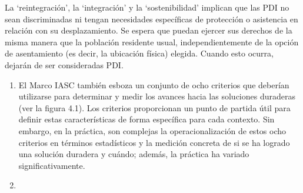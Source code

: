 \documentclass[
]{book}
\begin{document}
La `reintegración', la `integración' y la `sostenibilidad' implican que las PDI no sean discriminadas ni tengan necesidades específicas de protección o asistencia en relación con su desplazamiento. Se espera que puedan ejercer sus derechos de la misma manera que la población residente usual, independientemente de la opción de asentamiento (es decir, la ubicación física) elegida. Cuando esto ocurra, dejarán de ser consideradas PDI.

\begin{enumerate}
\def\labelenumi{\arabic{enumi}.}
\item
  El Marco IASC también esboza un conjunto de ocho criterios que deberían utilizarse para determinar y medir los avances hacia las soluciones duraderas (ver la figura 4.1). Los criterios proporcionan un punto de partida útil para definir estas características de forma específica para cada contexto. Sin embargo, en la práctica, son complejas la operacionalización de estos ocho criterios en términos estadísticos y la medición concreta de si se ha logrado una solución duradera y cuándo; además, la práctica ha variado significativamente.
\item ~
  \hypertarget{biblioteca-de-indicadores-de-soluciones-duraderas-y-guuxeda-de-anuxe1lisis}{%
}
\end{enumerate}
\end{document}
